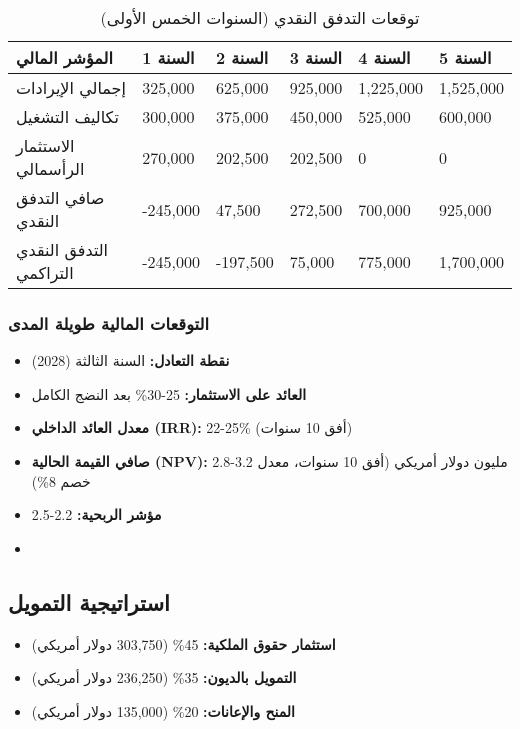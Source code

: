 \begin{table}[h]
\centering
\begin{tabular}{p{}p{}p{}p{}p{}p{}}
\hline
\textbf{المؤشر المالي} & \textbf{السنة 1} & \textbf{السنة 2} & \textbf{السنة 3} & \textbf{السنة 4} & \textbf{السنة 5} \\
\hline
إجمالي الإيرادات & 325,000 & 625,000 & 925,000 & 1,225,000 & 1,525,000 \\
تكاليف التشغيل & 300,000 & 375,000 & 450,000 & 525,000 & 600,000 \\
الاستثمار الرأسمالي & 270,000 & 202,500 & 202,500 & 0 & 0 \\
\hline
صافي التدفق النقدي & -245,000 & 47,500 & 272,500 & 700,000 & 925,000 \\
التدفق النقدي التراكمي & -245,000 & -197,500 & 75,000 & 775,000 & 1,700,000 \\
\hline
\end{tabular}
\caption{توقعات التدفق النقدي (السنوات الخمس الأولى)}
\end{table}

\subsubsection{التوقعات المالية طويلة المدى}
\begin{itemize}
    \item \textbf{نقطة التعادل:} السنة الثالثة (2028)
    \item \textbf{العائد على الاستثمار:} 25-30\% بعد النضج الكامل
    \item \textbf{معدل العائد الداخلي (IRR):} 22-25\% (أفق 10 سنوات)
    \item \textbf{صافي القيمة الحالية (NPV):} 2.8-3.2 مليون دولار أمريكي (أفق 10 سنوات، معدل خصم 8\%)
    \item \textbf{مؤشر الربحية:} 2.2-2.5
    \item \textbf{} 
\end{itemize}

\subsection{استراتيجية التمويل}
\begin{itemize}
    \item \textbf{استثمار حقوق الملكية:} 45\% (303,750 دولار أمريكي)
    \item \textbf{التمويل بالديون:} 35\% (236,250 دولار أمريكي)
    \item \textbf{المنح والإعانات:} 20\% (135,000 دولار أمريكي)
\end{itemize}

